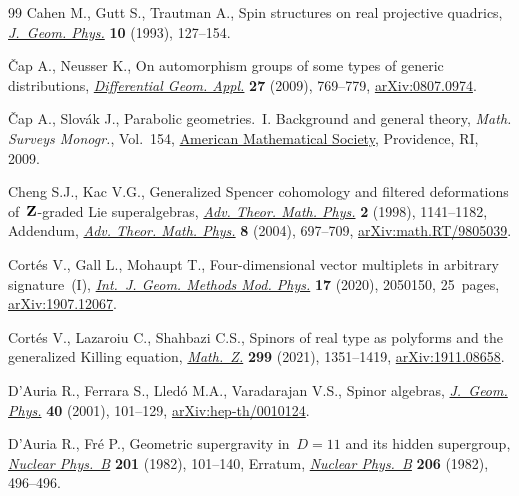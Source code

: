 \documentclass[11pt]{article}
\numberwithin{equation}{section}
\numberwithin{equation}{section}
\newcommand{\1}{\mathbbm{1}}
\begin{document}
\begin{thebibliography}{99}
Cahen M., Gutt S., Trautman A., Spin structures on real projective quadrics,
 \href{https://doi.org/10.1016/0393-0440(93)90025-A}{\textit{J.~Geom. Phys.}}
 \textbf{10} (1993), 127--154.

{\v{C}}ap A., Neusser K., On automorphism groups of some types of generic
 distributions,
 \href{https://doi.org/10.1016/j.difgeo.2009.05.003}{\textit{Differential
 Geom. Appl.}} \textbf{27} (2009), 769--779,
 \href{http://arxiv.org/abs/0807.0974}{arXiv:0807.0974}.

{\v{C}}ap A., Slov\'{a}k J., Parabolic geometries.~{I}. Background and general
 theory, \textit{Math. Surveys Monogr.}, Vol.~154,
 \href{https://doi.org/10.1090/surv/154}{American Mathematical Society},
 Providence, RI, 2009.

Cheng S.J., Kac V.G., Generalized {S}pencer cohomology and filtered
 deformations of~{${\bf Z}$}-graded {L}ie superalgebras,
 \href{https://doi.org/10.4310/ATMP.1998.v2.n5.a7}{\textit{Adv. Theor. Math.
 Phys.}} \textbf{2} (1998), 1141--1182, {A}ddendum,
 \href{https://doi.org/10.4310/ATMP.2004.v8.n4.a2}{\textit{Adv. Theor. Math.
 Phys.}} \textbf{8} (2004), 697--709,
 \href{http://arxiv.org/abs/math.RT/9805039}{arXiv:math.RT/9805039}.

Cort\'es V., Gall L., Mohaupt T., Four-dimensional vector multiplets in
 arbitrary signature~({I}),
 \href{https://doi.org/10.1142/S0219887820501509}{\textit{Int.~J. Geom.
 Methods Mod. Phys.}} \textbf{17} (2020), 2050150, 25~pages,
 \href{http://arxiv.org/abs/1907.12067}{arXiv:1907.12067}.

Cort\'es V., Lazaroiu C., Shahbazi C.S., Spinors of real type as polyforms and
 the generalized {K}illing equation,
 \href{https://doi.org/10.1007/s00209-021-02726-6}{\textit{Math.~Z.}}
 \textbf{299} (2021), 1351--1419,
 \href{http://arxiv.org/abs/1911.08658}{arXiv:1911.08658}.

D'Auria R., Ferrara S., Lled\'o M.A., Varadarajan V.S., Spinor algebras,
 \href{https://doi.org/10.1016/S0393-0440(01)00023-7}{\textit{J.~Geom. Phys.}}
 \textbf{40} (2001), 101--129,
 \href{http://arxiv.org/abs/hep-th/0010124}{arXiv:hep-th/0010124}.

D'Auria R., Fr\'e P., Geometric supergravity in~{$D=11$} and its hidden
 supergroup,
 \href{https://doi.org/10.1016/0550-3213(82)90376-5}{\textit{Nuclear Phys.~B}}
 \textbf{201} (1982), 101--140, {E}rratum,
 \href{https://doi.org/10.1016/0550-3213(82)90281-4}{\textit{Nuclear Phys.~B}}
 \textbf{206} (1982), 496--496.


\end{thebibliography}
\end{document}
